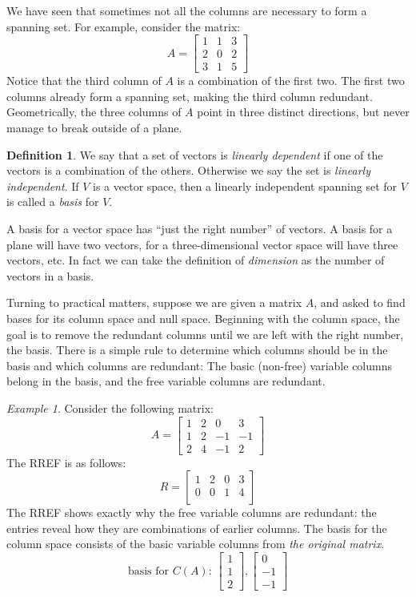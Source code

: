 \documentclass[11pt,oneside]{amsbook}
\theoremstyle{definition}
\theoremstyle{plain}
\theoremstyle{definition}
\newtheorem{definition}[theorem]{Definition}
\theoremstyle{remark}
\newtheorem{example}[theorem]{Example}
\numberwithin{equation}{section}
\numberwithin{figure}{section}
\begin{document}
We have seen that sometimes not all the columns are necessary to form a spanning set. For example, consider the matrix:
\[A=\begin{bmatrix}1&1&3\\2&0&2\\3&1&5\end{bmatrix}
\]
Notice that the third column of $A$ is a combination of the first two. The first two columns already form a spanning set, making the third column redundant. Geometrically, the three columns of $A$ point in three distinct directions, but never manage to break outside of a plane.

\begin{definition}
  We say that a set of vectors is \emph{linearly dependent} if one of the vectors is a combination of the others. Otherwise we say the set is \emph{linearly independent}. If $V$ is a vector space, then a linearly independent spanning set for $V$ is called a \emph{basis} for $V$.
\end{definition}

A basis for a vector space has ``just the right number'' of vectors. A basis for a plane will have two vectors, for a three-dimensional vector space will have three vectors, etc. In fact we can take the definition of \emph{dimension} as the number of vectors in a basis.

Turning to practical matters, suppose we are given a matrix $A$, and asked to find bases for its column space and null space. Beginning with the column space, the goal is to remove the redundant columns until we are left with the right number, the basis. There is a simple rule to determine which columns should be in the basis and which columns are redundant: The basic (non-free) variable columns belong in the basis, and the free variable columns are redundant.

\begin{example}
  Consider the following matrix:
  \[A=\begin{bmatrix}1&2&0&3\\1&2&-1&-1\\2&4&-1&2\end{bmatrix}
  \]
  The RREF is as follows:
  \[R=\begin{bmatrix}1&2&0&3\\0&0&1&4\\&&&\end{bmatrix}
  \]
  The RREF shows exactly why the free variable columns are redundant: the entries reveal how they are combinations of earlier columns. The basis for the column space consists of the basic variable columns from \emph{the original matrix}.
  \[\text{basis for $C(A)$: }\begin{bmatrix}1\\1\\2\end{bmatrix},
  \begin{bmatrix}0\\-1\\-1\end{bmatrix}
  \]
\end{example}
\end{document}
